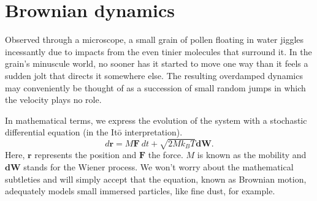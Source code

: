\section{Brownian dynamics}

Observed through a microscope, a small grain of pollen floating in water jiggles 
incessantly due to impacts from the even tinier molecules that surround it. In 
the grain's minuscule world, no sooner has it started to move one way than it 
feels a sudden jolt that directs it somewhere else. The resulting overdamped 
dynamics may conveniently be thought of as a succession of small random jumps in 
which the velocity plays no role.

In mathematical terms, we express the evolution of the system with a stochastic 
differential equation (in the It\=o interpretation).
\begin{equation*}
  d\mathbf{r} = M\mathbf{F}\ dt + \sqrt{2 M k_BT} \mathbf{dW}.
\end{equation*}
Here, $\mathbf{r}$ represents the position and $\mathbf{F}$ the force. $M$ is 
known as the mobility and $\mathbf{dW}$ stands for the Wiener process. We won't 
worry about the mathematical subtleties and will simply accept that the 
equation, known as Brownian motion, adequately models small immersed particles, 
like fine dust, for example.

